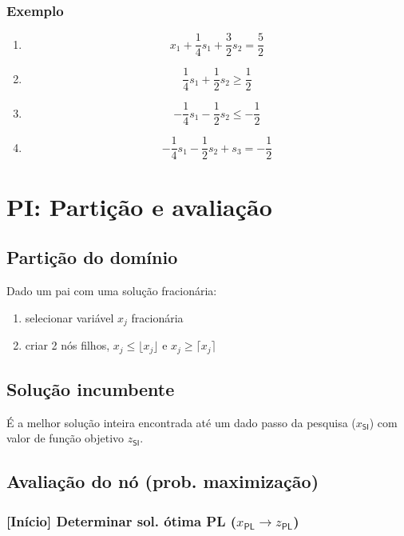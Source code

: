 \documentclass[10pt, a4paper]{article}
\begin{document}
\begin{multicols}{2}
\subsubsection{Exemplo}

\begin{enumerate}
    \item \[ x_1 + \frac{1}{4}s_1 + \frac{3}{2} s_2 = \frac{5}{2} \]
    \item \[ \frac{1}{4}s_1 + \frac{1}{2} s_2 \ge \frac{1}{2} \]
    \item \[ - \frac{1}{4}s_1 - \frac{1}{2} s_2 \le - \frac{1}{2} \]
    \item \[ - \frac{1}{4}s_1 - \frac{1}{2} s_2 + s_3 = - \frac{1}{2} \]
\end{enumerate}





\section{PI: Partição e avaliação}

\subsection{Partição do domínio}

Dado um pai com uma solução fracionária:
\begin{enumerate}
    \item selecionar variável \(x_j\) fracionária
    \item criar 2 nós filhos, \(x_j \le \lfloor x_j \rfloor\) e \(x_j \ge \lceil x_j \rceil \)
\end{enumerate}

\subsection{Solução incumbente}

É a melhor solução inteira encontrada até um dado passo da pesquisa (\(x_\textsf{SI}\)) com valor de função objetivo \(z_\textsf{SI}\).

\subsection{Avaliação do nó (prob. maximização)}

\subsubsection{[Início] Determinar sol. ótima PL (\(x_\textsf{PL} \rightarrow z_\textsf{PL}\))}


\end{multicols}
\end{document}
